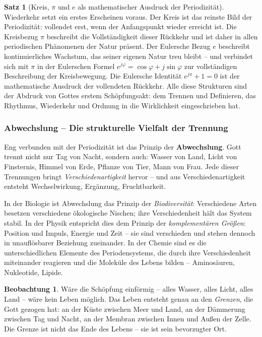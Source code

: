 ﻿\documentclass[a4paper,12pt]{article}
\theoremstyle{definition}
\newtheorem{theorem}{Satz}[section]
\newtheorem{observation}{Beobachtung}[section]
\begin{document}
\begin{theorem}[Kreis, $\pi$ und $e$ als mathematischer Ausdruck der Periodizität]
	Wiederkehr setzt ein erstes Erscheinen voraus. Der Kreis ist das reinste Bild
	der Periodizität: vollendet erst, wenn der Anfangspunkt wieder erreicht ist.
	Die Kreisbezug $\pi$ beschreibt die Vollständigkeit dieser Rückkehr und ist
	daher in allen periodischen Phänomenen der Natur präsent. Der Eulersche Bezug
	$e$ beschreibt kontinuierliches Wachstum, das seiner eigenen Natur treu bleibt
	-- und verbindet sich mit $\pi$ in der Eulerschen Formel $e^{j\varphi} =
	\cos\varphi + j\sin\varphi$ zur vollständigen Beschreibung der Kreisbewegung.
	Die Eulersche Identität $e^{j\pi} + 1 = 0$ ist der mathematische Ausdruck
	der vollendeten Rückkehr. Alle diese Strukturen sind der Abdruck von Gottes
	erstem Schöpfungsakt: dem Trennen und Definieren, das Rhythmus, Wiederkehr
	und Ordnung in die Wirklichkeit eingeschrieben hat.
\end{theorem}

\subsubsection{Abwechslung -- Die strukturelle Vielfalt der Trennung}

Eng verbunden mit der Periodizität ist das Prinzip der \textbf{Abwechslung}. Gott
trennt nicht nur Tag von Nacht, sondern auch: Wasser von Land, Licht von Finsternis,
Himmel von Erde, Pflanze von Tier, Mann von Frau. Jede dieser Trennungen bringt
\textit{Verschiedenartigkeit} hervor -- und aus Verschiedenartigkeit entsteht
Wechselwirkung, Ergänzung, Fruchtbarkeit.

In der Biologie ist Abwechslung das Prinzip der \textit{Biodiversität}: Verschiedene
Arten besetzen verschiedene ökologische Nischen; ihre Verschiedenheit hält das
System stabil. In der Physik entspricht dies dem Prinzip der \textit{komplementären
	Größen}: Position und Impuls, Energie und Zeit -- sie sind verschieden und stehen
dennoch in unauflösbarer Beziehung zueinander. In der Chemie sind es die
unterschiedlichen Elemente des Periodensystems, die durch ihre Verschiedenheit
miteinander reagieren und die Moleküle des Lebens bilden -- Aminosäuren, Nukleotide,
Lipide.

\begin{observation}
	Wäre die Schöpfung einförmig -- alles Wasser, alles Licht, alles Land --
	wäre kein Leben möglich. Das Leben entsteht genau an den \textit{Grenzen}, die
	Gott gezogen hat: an der Küste zwischen Meer und Land, an der Dämmerung zwischen
	Tag und Nacht, an der Membran zwischen Innen und Außen der Zelle. Die Grenze
	ist nicht das Ende des Lebens -- sie ist sein bevorzugter Ort.
\end{observation}
\end{document}
